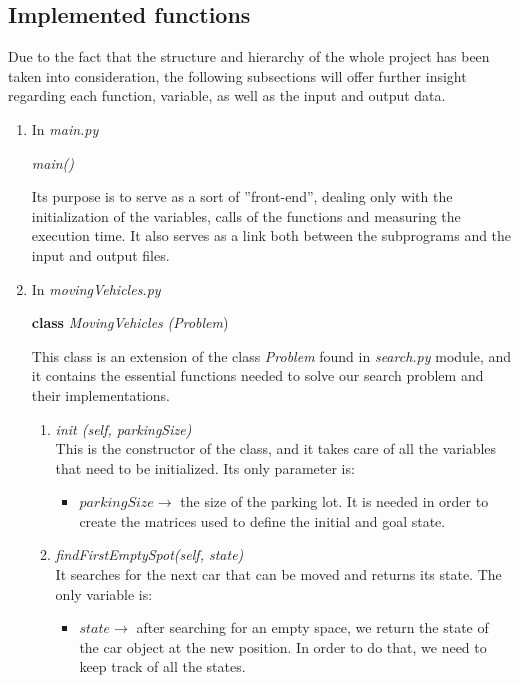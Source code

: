 \documentclass{article}
\begin{document}
\subsection{Implemented functions}
Due to the fact that the structure and hierarchy of the whole project has been taken into consideration, the following subsections will offer further insight regarding each function, variable, as well as the input and output data. 


\begin{enumerate}[label=\Roman*]

\item In \emph{main.py}
    \begin{center}
         \emph{main()} \\
      \end{center}
    Its purpose is to serve as a sort of ”front-end”, dealing only with the initialization of the variables, calls of the functions and measuring the execution time. It also serves as a link both between the subprograms and the input and output files.
    
\item In \emph{movingVehicles.py}
      \begin{center}
          \textbf{class} \emph{MovingVehicles} \emph{(Problem})\\
      \end{center}
     This class is an extension of the class \emph{Problem} found in \emph{search.py} module, and it contains the essential functions needed to solve our search problem and their implementations. 
     
     \begin{enumerate}
    \item \emph{\textunderscore \textunderscore init \textunderscore \textunderscore(\emph{self}, parkingSize)}\\
    This is the constructor of the class, and it takes care of all the variables that need to be initialized. Its only parameter is: 
    \begin{itemize}
        \item $parkingSize \rightarrow$ the size of the parking lot. It is needed in order to create the matrices used to define the initial and goal state. 
    \end{itemize}

    
    \item \emph{findFirstEmptySpot(\emph{self}, state)} \\
    It searches for the next car that can be moved and returns its state. The only variable is:
    \begin{itemize}
        \item $state \rightarrow$ after searching for an empty space, we return the state of the car object at the new position. In order to do that, we need to keep track of all the states. 
    \end{itemize}
         

\end{enumerate}
\end{enumerate}
\end{document}
